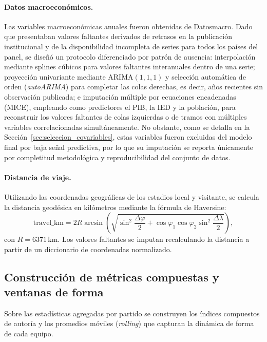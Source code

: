 \paragraph{Datos macroecon\'omicos.} Las variables macroecon\'omicas anuales fueron obtenidas de Datosmacro. Dado que presentaban valores faltantes derivados de retrasos en la publicaci\'on institucional y de la disponibilidad incompleta de series para todos los pa\'ises del panel, se dise\~n\'o un protocolo diferenciado por patr\'on de ausencia: interpolaci\'on mediante splines c\'ubicos para valores faltantes interanuales dentro de una serie; proyecci\'on univariante mediante ARIMA$(1,1,1)$ y selecci\'on autom\'atica de orden (\emph{autoARIMA}) para completar las colas derechas, es decir, a\~nos recientes sin observaci\'on publicada; e imputaci\'on m\'ultiple por ecuaciones encadenadas (MICE), empleando como predictores el PIB, la IED y la poblaci\'on, para reconstruir los valores faltantes de colas izquierdas o de tramos con m\'ultiples variables correlacionadas simult\'aneamente. No obstante, como se detalla en la Secci\'on~\ref{sec:seleccion_covariables}, estas variables fueron excluidas del modelo final por baja se\~nal predictiva, por lo que su imputaci\'on se reporta \'unicamente por completitud metodol\'ogica y reproducibilidad del conjunto de datos.

\paragraph{Distancia de viaje.} Utilizando las coordenadas geogr\'aficas de los estadios local y visitante, se calcula la distancia geod\'esica en kil\'ometros mediante la f\'ormula de Haversine:
\begin{equation}
	\text{travel\_km} = 2R \arcsin\!\left(\sqrt{\sin^2\!\frac{\Delta\varphi}{2} 
		+ \cos\varphi_1 \cos\varphi_2 \sin^2\!\frac{\Delta\lambda}{2}}\right),
\end{equation}
con $R = 6371\,\text{km}$. Los valores faltantes se imputan recalculando la distancia a partir de un diccionario de coordenadas normalizado.

\subsection{Construcci\'on de m\'etricas compuestas y ventanas de forma}
\label{subsec:metricas_compuestas}

Sobre las estad\'isticas agregadas por partido se construyen los \'indices compuestos de autor\'ia y los promedios m\'oviles (\textit{rolling}) que capturan la din\'amica de forma de cada equipo.

